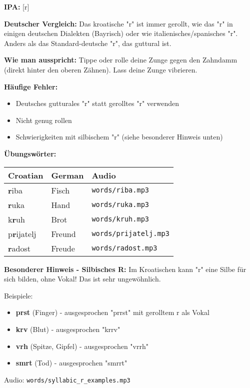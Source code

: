\begin{tcolorbox}[breakable, colback=lightyellow!30, colframe=orange, title=\textbf{R, r}]

\textbf{IPA:} [r]

\textbf{Deutscher Vergleich:}
Das kroatische "r" ist immer gerollt, wie das "r" in einigen deutschen Dialekten (Bayrisch) oder wie italienisches/spanisches "r". Anders als das Standard-deutsche "r", das guttural ist.

\textbf{Wie man ausspricht:}
Tippe oder rolle deine Zunge gegen den Zahndamm (direkt hinter den oberen Zähnen). Lass deine Zunge vibrieren.

\textbf{Häufige Fehler:}
\begin{itemize}
    \item Deutsches gutturales "r" statt gerolltes "r" verwenden
    \item Nicht genug rollen
    \item Schwierigkeiten mit silbischem "r" (siehe besonderer Hinweis unten)
\end{itemize}

\textbf{Übungswörter:}
\begin{center}
\small
\begin{tabular}{lll}
\textbf{Croatian} & \textbf{German} & \textbf{Audio} \\
\midrule
\textbf{r}iba & Fisch & \small\texttt{words/riba.mp3} \\
\textbf{r}uka & Hand & \small\texttt{words/ruka.mp3} \\
k\textbf{r}uh & Brot & \small\texttt{words/kruh.mp3} \\
p\textbf{r}ijatelj & Freund & \small\texttt{words/prijatelj.mp3} \\
\textbf{r}adost & Freude & \small\texttt{words/radost.mp3} \\
\end{tabular}
\end{center}

\textbf{Besonderer Hinweis - Silbisches R:}
Im Kroatischen kann "r" eine Silbe für sich bilden, ohne Vokal! Das ist sehr ungewöhnlich.

Beispiele:
\begin{itemize}
    \item \textbf{prst} (Finger) - ausgesprochen "prrst" mit gerolltem r als Vokal
    \item \textbf{krv} (Blut) - ausgesprochen "krrv"
    \item \textbf{vrh} (Spitze, Gipfel) - ausgesprochen "vrrh"
    \item \textbf{smrt} (Tod) - ausgesprochen "smrrt"
\end{itemize}

Audio: \small\texttt{words/syllabic\_r\_examples.mp3}

\end{tcolorbox}

